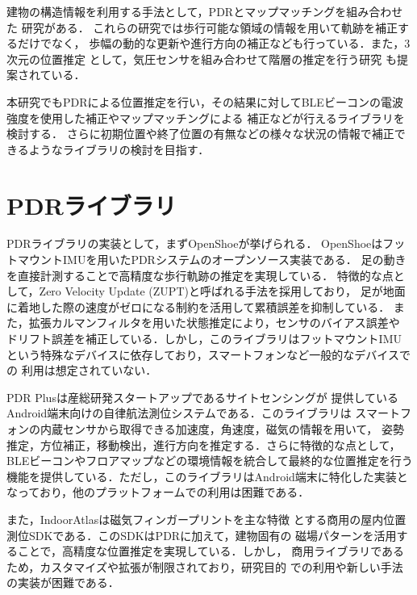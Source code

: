 建物の構造情報を利用する手法として，PDRとマップマッチングを組み合わせた
研究\cite{pdr-map}\cite{additional-map-matching-paper}がある．
これらの研究では歩行可能な領域の情報を用いて軌跡を補正するだけでなく，
歩幅の動的な更新や進行方向の補正なども行っている．また，3次元の位置推定
として，気圧センサを組み合わせて階層の推定を行う研究\cite{3d-pdr-paper}
も提案されている．

本研究でもPDRによる位置推定を行い，その結果に対してBLEビーコンの電波強度を使用した補正やマップマッチングによる
補正などが行えるライブラリを検討する．
さらに初期位置や終了位置の有無などの様々な状況の情報で補正できるようなライブラリの検討を目指す．


\section{PDRライブラリ}

PDRライブラリの実装として，まずOpenShoe\cite{openshoe}が挙げられる．
OpenShoeはフットマウントIMUを用いたPDRシステムのオープンソース実装である．
足の動きを直接計測することで高精度な歩行軌跡の推定を実現している．
特徴的な点として，Zero Velocity Update (ZUPT)と呼ばれる手法を採用しており，
足が地面に着地した際の速度がゼロになる制約を活用して累積誤差を抑制している．
また，拡張カルマンフィルタを用いた状態推定により，センサのバイアス誤差や
ドリフト誤差を補正している．しかし，このライブラリはフットマウントIMU
という特殊なデバイスに依存しており，スマートフォンなど一般的なデバイスでの
利用は想定されていない．

PDR Plus\cite{pdr-plus}は産総研発スタートアップであるサイトセンシングが
提供しているAndroid端末向けの自律航法測位システムである．このライブラリは
スマートフォンの内蔵センサから取得できる加速度，角速度，磁気の情報を用いて，
姿勢推定，方位補正，移動検出，進行方向を推定する．さらに特徴的な点として，
BLEビーコンやフロアマップなどの環境情報を統合して最終的な位置推定を行う
機能を提供している．ただし，このライブラリはAndroid端末に特化した実装と
なっており，他のプラットフォームでの利用は困難である．

また，IndoorAtlas\cite{indoor-atlas}は磁気フィンガープリントを主な特徴
とする商用の屋内位置測位SDKである．このSDKはPDRに加えて，建物固有の
磁場パターンを活用することで，高精度な位置推定を実現している．しかし，
商用ライブラリであるため，カスタマイズや拡張が制限されており，研究目的
での利用や新しい手法の実装が困難である．


